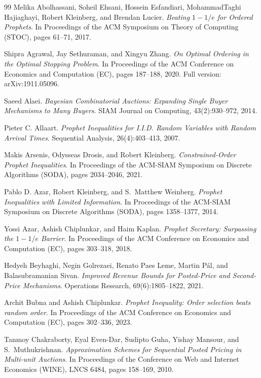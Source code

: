\documentclass[11pt]{article}
\theoremstyle{definition}
\theoremstyle{remark}
\begin{document}
\begin{thebibliography}{99}
Melika Abolhassani, Soheil Ehsani, Hossein Esfandiari, MohammadTaghi Hajiaghayi, Robert Kleinberg, and Brendan Lucier.
\emph{Beating $1-1/e$ for Ordered Prophets}.
In Proceedings of the ACM Symposium on Theory of Computing (STOC), pages 61--71, 2017.

Shipra Agrawal, Jay Sethuraman, and Xingyu Zhang.
\emph{On Optimal Ordering in the Optimal Stopping Problem}.
In Proceedings of the ACM Conference on Economics and Computation (EC), pages 187--188, 2020. Full version: arXiv:1911.05096.

Saeed Alaei.
\emph{Bayesian Combinatorial Auctions: Expanding Single Buyer Mechanisms to Many Buyers}.
SIAM Journal on Computing, 43(2):930--972, 2014.

Pieter C. Allaart.
\emph{Prophet Inequalities for I.I.D. Random Variables with Random Arrival Times}.
Sequential Analysis, 26(4):403--413, 2007.

Makis Arsenis, Odysseas Drosis, and Robert Kleinberg.
\emph{Constrained-Order Prophet Inequalities}.
In Proceedings of the ACM-SIAM Symposium on Discrete Algorithms (SODA), pages 2034--2046, 2021.

Pablo D. Azar, Robert Kleinberg, and S.~Matthew Weinberg.
\emph{Prophet Inequalities with Limited Information}.
In Proceedings of the ACM-SIAM Symposium on Discrete Algorithms (SODA), pages 1358--1377, 2014.

Yossi Azar, Ashish Chiplunkar, and Haim Kaplan.
\emph{Prophet Secretary: Surpassing the $1-1/e$ Barrier}.
In Proceedings of the ACM Conference on Economics and Computation (EC), pages 303--318, 2018.

Hedyeh Beyhaghi, Negin Golrezaei, Renato Paes Leme, Martin P\'al, and Balasubramanian Sivan.
\emph{Improved Revenue Bounds for Posted-Price and Second-Price Mechanisms}.
Operations Research, 69(6):1805--1822, 2021.

Archit Bubna and Ashish Chiplunkar.
\emph{Prophet Inequality: Order selection beats random order}.
In Proceedings of the ACM Conference on Economics and Computation (EC), pages 302--336, 2023.

Tanmoy Chakraborty, Eyal Even-Dar, Sudipto Guha, Yishay Mansour, and S.~Muthukrishnan.
\emph{Approximation Schemes for Sequential Posted Pricing in Multi-unit Auctions}.
In Proceedings of the Conference on Web and Internet Economics (WINE), LNCS 6484, pages 158--169, 2010.


\end{thebibliography}
\end{document}
